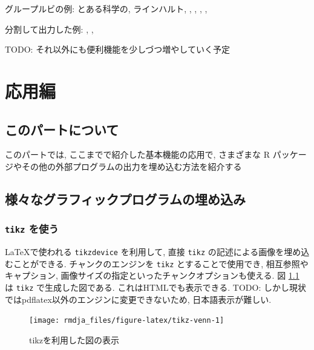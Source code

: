 \documentclass[
]{bxjsbook}
\theoremstyle{definition}
\theoremstyle{definition}
\theoremstyle{definition}
\theoremstyle{remark}
\begin{document}
グループルビの例: とある科学の,
ラインハルト,
,
,
, , 

分割して出力した例:
,
 ,

TODO: それ以外にも便利機能を少しづつ増やしていく予定

\hypertarget{part-ux5fdcux7528ux7de8}{%
\part{応用編}\label{part-ux5fdcux7528ux7de8}}

\hypertarget{ux3053ux306eux30d1ux30fcux30c8ux306bux3064ux3044ux3066}{%
\chapter*{このパートについて}\label{ux3053ux306eux30d1ux30fcux30c8ux306bux3064ux3044ux3066}}

このパートでは, ここまでで紹介した基本機能の応用で, さまざまな R
パッケージやその他の外部プログラムの出力を埋め込む方法を紹介する

\hypertarget{advanced-graph}{%
\chapter{様々なグラフィックプログラムの埋め込み}\label{advanced-graph}}

\hypertarget{tikz-ux3092ux4f7fux3046}{%
\section{\texorpdfstring{\texttt{tikz}
を使う}{tikz を使う}}\label{tikz-ux3092ux4f7fux3046}}

\LaTeX で使われる \texttt{tikzdevice} を利用して, 直接 \texttt{tikz}
の記述による画像を埋め込むことができる. チャンクのエンジンを
\texttt{tikz} とすることで使用でき, 相互参照やキャプション,
画像サイズの指定といったチャンクオプションも使える. 図
\ref{fig:tikz-venn} は \texttt{tikz} で生成した図である.
これはHTMLでも表示できる. TODO:
しかし現状ではpdflatex以外のエンジンに変更できないため,
日本語表示が難しい.

\begin{figure}

{\centering \texttt{[image: rmdja\_files/figure-latex/tikz-venn-1]} 

}

\caption{tikzを利用した図の表示}\label{fig:tikz-venn}
\end{figure}
\end{document}
